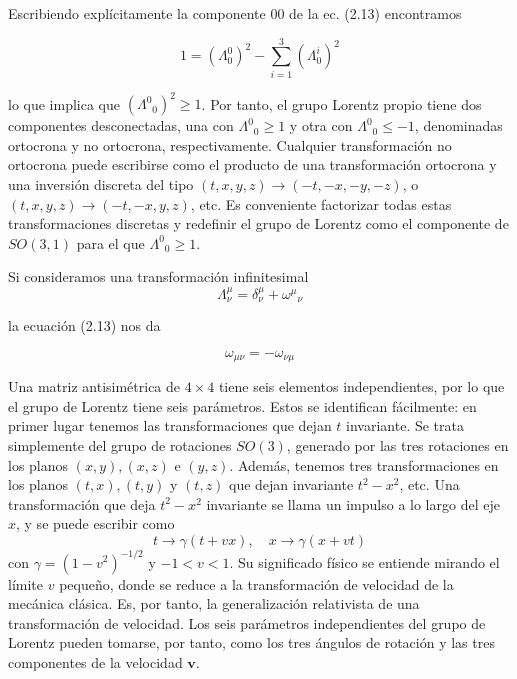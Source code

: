 Escribiendo explícitamente la componente 00 de la ec. (2.13) encontramos

\begin{equation*}
  1=\left(\Lambda_{0}^{0}\right)^{2}-\sum_{i=1}^{3}\left(\Lambda_{0}^{i}\right)^{2} \tag{2.14}
  \end{equation*}

  lo que implica que $\left(\Lambda^{0}{ }_{0}\right)^{2} \geqslant 1$. Por tanto, el grupo Lorentz propio tiene dos componentes desconectadas, una con $\Lambda^{0}{ }_{0} \geqslant 1$ y otra con $\Lambda^{0}{ }_{0} \leqslant-1$, denominadas ortocrona y no ortocrona, respectivamente. Cualquier transformación no ortocrona puede escribirse como el producto de una transformación ortocrona y una inversión discreta del tipo $(t, x, y, z) \rightarrow(-t,-x,-y,-z)$, o $(t, x, y, z) \rightarrow(-t,-x, y, z)$, etc. Es conveniente factorizar todas estas transformaciones discretas y redefinir el grupo de Lorentz como el componente de $S O(3,1)$ para el que $\Lambda^{0}{ }_{0} \geqslant 1$.

Si consideramos una transformación infinitesimal
\begin{equation*}
  \Lambda_{\nu}^{\mu}=\delta_{\nu}^{\mu}+\omega^{\mu}{ }_{\nu} \tag{2.15}
  \end{equation*}

  la ecuación (2.13) nos da

  \begin{equation*}
    \omega_{\mu \nu}=-\omega_{\nu \mu} \tag{2.16}
    \end{equation*}

    Una matriz antisimétrica de $4 \times 4$ tiene seis elementos independientes, por lo que el grupo de Lorentz tiene seis parámetros. Estos se identifican fácilmente: en primer lugar tenemos las transformaciones que dejan $t$ invariante. Se trata simplemente del grupo de rotaciones $S O(3)$, generado por las tres rotaciones en los planos $(x, y),(x, z)$ e $(y, z)$. Además, tenemos tres transformaciones en los planos $(t, x),(t, y)$ y $(t, z)$ que dejan invariante $t^{2}-x^{2}$, etc. Una transformación que deja $t^{2}-x^{2}$ invariante se llama un impulso a lo largo del eje $x$, y se puede escribir como
    \begin{equation*}
      t \rightarrow \gamma(t+v x), \quad x \rightarrow \gamma(x+v t) \tag{2.17}
      \end{equation*}
      con $\gamma=\left(1-v^{2}\right)^{-1 / 2}$ y $-1<v<1$. Su significado físico se entiende mirando el límite $v$ pequeño, donde se reduce a la transformación de velocidad de la mecánica clásica. Es, por tanto, la generalización relativista de una transformación de velocidad. Los seis parámetros independientes del grupo de Lorentz pueden tomarse, por tanto, como los tres ángulos de rotación y las tres componentes de la velocidad $\mathbf{v}$.


